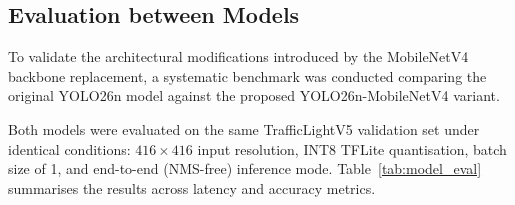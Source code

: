
\subsection{Evaluation between Models}

To validate the architectural modifications introduced by the MobileNetV4 backbone replacement, a systematic benchmark was conducted comparing the original YOLO26n model against the proposed YOLO26n-MobileNetV4 variant. 

Both models were evaluated on the same TrafficLightV5 validation set under identical conditions: $416 \times 416$ input resolution, INT8 TFLite quantisation, batch size of 1, and end-to-end (NMS-free) inference mode. Table~\ref{tab:model_eval} summarises the results across latency and accuracy metrics.

